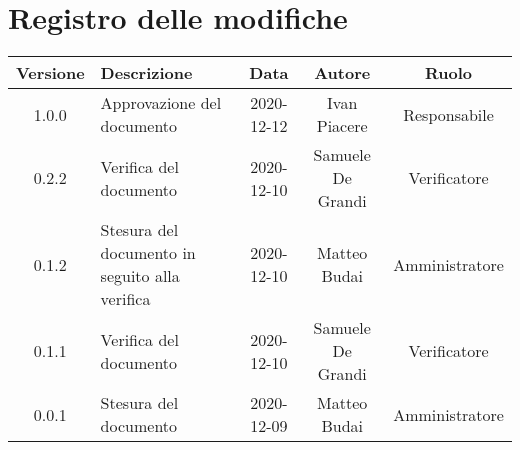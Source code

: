 \section*{Registro delle modifiche}

\begin{center}
	\begin{longtable}{|c|p{5cm}|c|c|c|}
	\hline
	\rowcolor{lighter-grayer}
	\textbf{Versione} & \textbf{Descrizione} & \textbf{Data} & \textbf{Autore} & \textbf{Ruolo} \\
	\hline
	\endfirsthead


	\hline
	1.0.0 & Approvazione del documento & 2020-12-12 & Ivan Piacere & Responsabile \\
	\hline
	0.2.2 & Verifica del documento & 2020-12-10 & Samuele De Grandi & Verificatore \\
	\hline
    0.1.2 & Stesura del documento in seguito alla verifica & 2020-12-10 & Matteo Budai & Amministratore \\
    \hline
    0.1.1 & Verifica del documento & 2020-12-10 & Samuele De Grandi & Verificatore \\
    \hline
    0.0.1 & Stesura del documento & 2020-12-09 & Matteo Budai & Amministratore \\
    \hline
	\end{longtable}
\end{center}